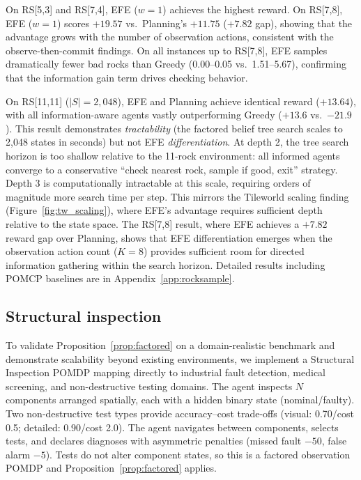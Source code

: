\documentclass[runningheads]{llncs}
\begin{document}
On RS[5,3] and RS[7,4], EFE ($w{=}1$) achieves the highest reward. On RS[7,8], EFE ($w{=}1$) scores $+19.57$ vs.\ Planning's $+11.75$ ($+7.82$ gap), showing that the advantage grows with the number of observation actions, consistent with the observe-then-commit findings. On all instances up to RS[7,8], EFE samples dramatically fewer bad rocks than Greedy (0.00--0.05 vs.\ 1.51--5.67), confirming that the information gain term drives checking behavior.

On RS[11,11] ($|S|{=}2{,}048$), EFE and Planning achieve identical reward ($+13.64$), with all information-aware agents vastly outperforming Greedy ($+13.6$ vs.\ $-21.9$). This result demonstrates \emph{tractability} (the factored belief tree search scales to 2{,}048 states in seconds) but not EFE \emph{differentiation}. At depth 2, the tree search horizon is too shallow relative to the 11-rock environment: all informed agents converge to a conservative ``check nearest rock, sample if good, exit'' strategy. Depth 3 is computationally intractable at this scale, requiring orders of magnitude more search time per step. This mirrors the Tileworld scaling finding (Figure~\ref{fig:tw_scaling}), where EFE's advantage requires sufficient depth relative to the state space. The RS[7,8] result, where EFE achieves a $+7.82$ reward gap over Planning, shows that EFE differentiation emerges when the observation action count ($K{=}8$) provides sufficient room for directed information gathering within the search horizon. Detailed results including POMCP baselines are in Appendix~\ref{app:rocksample}.

\subsection{Structural inspection}
\label{sec:inspection}

To validate Proposition~\ref{prop:factored} on a domain-realistic benchmark and demonstrate scalability beyond existing environments, we implement a Structural Inspection POMDP mapping directly to industrial fault detection, medical screening, and non-destructive testing domains. The agent inspects $N$ components arranged spatially, each with a hidden binary state (nominal/faulty). Two non-destructive test types provide accuracy--cost trade-offs (visual: 0.70/cost 0.5; detailed: 0.90/cost 2.0). The agent navigates between components, selects tests, and declares diagnoses with asymmetric penalties (missed fault $-50$, false alarm $-5$). Tests do not alter component states, so this is a factored observation POMDP and Proposition~\ref{prop:factored} applies.
\end{document}
